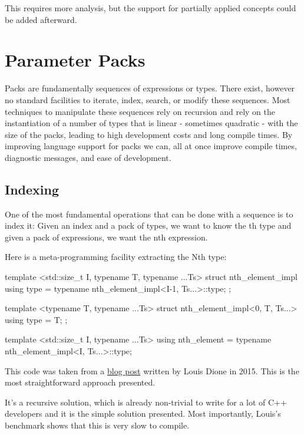 \documentclass{wg21}
\begin{document}
This requires more analysis, but the support for partially applied concepts could be added afterward.

\section{Parameter Packs}

Packs are fundamentally sequences of expressions or types.
There exist, however no standard facilities to iterate, index, search, or modify these sequences.
Most techniques to manipulate these sequences rely on recursion and rely on the instantiation of a number of types that is linear - sometimes quadratic - with the size of the packs, leading to high development costs and long compile times.
By improving language support for packs we can, all at once improve compile times, diagnostic messages, and ease of development.

\subsection{Indexing}
\label{sec:packindexing}

One of the most fundamental operations that can be done with a sequence is to index it:
Given an index  and a pack of types, we want to know the th type and given a pack of expressions, we want the nth expression.

Here is a meta-programming facility extracting the Nth type:

\begin{colorblock}
template <std::size_t I, typename T, typename ...Ts>
struct nth_element_impl {
    using type = typename nth_element_impl<I-1, Ts...>::type;
};

template <typename T, typename ...Ts>
struct nth_element_impl<0, T, Ts...> {
    using type = T;
};

template <std::size_t I, typename ...Ts>
using nth_element = typename nth_element_impl<I, Ts...>::type;
\end{colorblock}

This code was taken from a \href{https://ldionne.com/2015/11/29/efficient-parameter-pack-indexing/}{blog post} written by Louis Dione in 2015.
This is the most straightforward approach presented.

It's a recursive solution, which is already non-trivial to write for a lot of C++ developers and it is the simple solution presented.
Most importantly, Louis's benchmark shows that this is very slow to compile.
\end{document}
